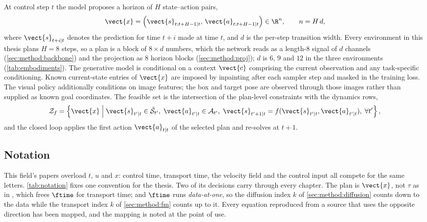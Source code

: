 At control step $t$ the model proposes a horizon of $H$ state--action pairs,
\begin{equation}\label{eq:method:plan}
  \vect{x}
  = \left(\vect{s}_{t:t+H-1|t},\,\vect{a}_{t:t+H-1|t}\right) \in \R^{n},
  \qquad n = H\,d,
\end{equation}
where $\vect{s}_{t+i|t}$ denotes the prediction for time $t+i$ made at time $t$, and $d$ is the
per-step transition width. Every environment in this thesis plans $H = 8$ steps, so a plan is a
block of $8 \times d$ numbers, which the network reads as a length-$8$ signal of $d$ channels
(\autoref{sec:method:backbone}) and the projection as $8$ horizon blocks
(\autoref{sec:method:proj}); $d$ is $6$, $9$ and $12$ in the three environments
(\autoref{tab:embodiments}). The generative model is conditional on a context
$\vect{c}$ comprising the current observation and any task-specific conditioning. Known current-state entries of
$\vect{x}$ are imposed by inpainting after each sampler step and masked in the training loss.
The visual policy additionally conditions on image features; the box and target pose are observed
through those images rather than supplied as known goal coordinates.
The feasible set is the intersection of the plan-level constraints with the dynamics rows,
\begin{equation}\label{eq:method:feasible}
  \mathcal{Z}_{f} = \left\{\vect{x} \;\middle|\;
    \vect{s}_{t'|t}\in\tilde{\mathcal{S}}_{t'},\;
    \vect{a}_{t'|t}\in\mathcal{A}_{t'},\;
    \vect{s}_{t'+1|t} = f(\vect{s}_{t'|t},\vect{a}_{t'|t}),\;
    \forall t'\right\},
\end{equation}
and the closed loop applies the first action $\vect{a}_{t|t}$ of the selected plan and re-solves
at $t+1$.

\subsection{Notation}

This field's papers overload $t$, $u$ and $x$: control time, transport time, the velocity field
and the control input all compete for the same letters. \autoref{tab:notation} fixes one
convention for the thesis. Two of its decisions carry through every chapter. The plan is
$\vect{x}$, not $\tau$ as in \parencite{romer2025diffusion}, which frees $\ftime$ for transport time;
and $\ftime$ runs \emph{data-at-one}, so the diffusion index $k$ of \autoref{sec:method:diffusion}
counts down to the data while the transport index $k$ of \autoref{sec:method:fm} counts up to it. Every
equation reproduced from a source that uses the opposite direction has been mapped, and the
mapping is noted at the point of use.

